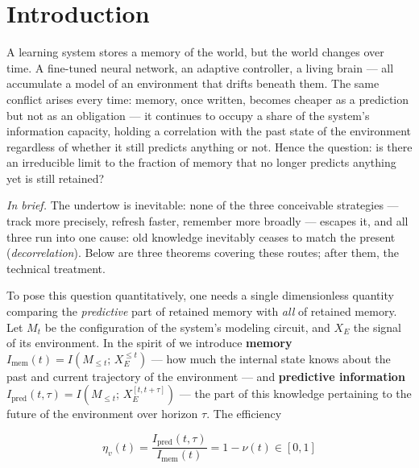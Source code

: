 \documentclass[12pt]{iopart}
\begin{document}
\maketitle

\section{Introduction}\label{introduction}



A learning system stores a memory of the world, but the world changes over time. A fine-tuned neural network, an adaptive controller, a living brain --- all accumulate a model of an environment that drifts beneath them. The same conflict arises every time: memory, once written, becomes cheaper as a prediction but not as an obligation --- it continues to occupy a share of the system's information capacity, holding a correlation with the past state of the environment regardless of whether it still predicts anything or not. Hence the question: is there an irreducible limit to the fraction of memory that no longer predicts anything yet is still retained?



\emph{In brief.} The undertow is inevitable: none of the three conceivable strategies --- track more precisely, refresh faster, remember more broadly --- escapes it, and all three run into one cause: old knowledge inevitably ceases to match the present (\emph{decorrelation}). Below are three theorems covering these routes; after them, the technical treatment.



To pose this question quantitatively, one needs a single dimensionless quantity comparing the \emph{predictive} part of retained memory with \emph{all} of retained memory. Let \(M_t\) be the configuration of the system's modeling circuit, and \(X_E\) the signal of its environment. In the spirit of \cite{Still2012,BialekNemenmanTishby2001} we introduce \textbf{memory} \(I_{\text{mem}}(t) = I(M_{\le t};\, X_E^{\le t})\) --- how much the internal state knows about the past and current trajectory of the environment --- and \textbf{predictive information} \(I_{\text{pred}}(t,\tau) = I(M_{\le t};\, X_E^{[t,t+\tau]})\) --- the part of this knowledge pertaining to the future of the environment over horizon \(\tau\). The efficiency



\[\eta_v(t) = \frac{I_{\text{pred}}(t,\tau)}{I_{\text{mem}}(t)} = 1 - \nu(t) \in [0,1]\]
\end{document}
